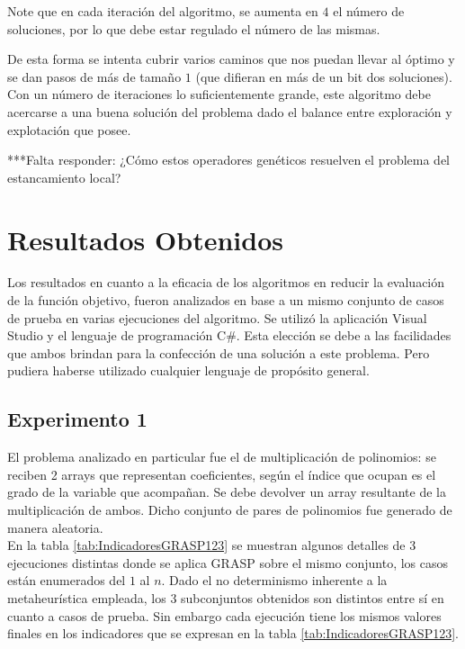 \documentclass[a4paper,12pt]{book}
\begin{document}
		Note que en cada iteración del algoritmo, se aumenta en $4$ el número de soluciones, por lo que debe estar regulado el número de las mismas.
	
		De esta forma se intenta cubrir varios caminos que nos puedan llevar al óptimo y se dan pasos de más de tamaño $1$ (que difieran en más de un bit dos soluciones). Con un número de iteraciones lo suficientemente grande, este algoritmo debe acercarse a una buena solución del problema dado el balance entre exploración y explotación que posee.
		
		***Falta responder: ¿Cómo estos operadores genéticos resuelven el problema del estancamiento local?
	
\chapter{Resultados Obtenidos}

	Los resultados en cuanto a la eficacia de los algoritmos en reducir la evaluación de la función objetivo, fueron analizados en base a un mismo conjunto de casos de prueba en varias ejecuciones del algoritmo. Se utilizó la aplicación Visual Studio y el lenguaje de programación C\#. Esta elección se debe a las facilidades que ambos brindan para la confección de una solución a este problema. Pero pudiera haberse utilizado cualquier lenguaje de propósito general. 
	
	\section{Experimento 1}
	El problema analizado en particular fue el de multiplicación de polinomios: se reciben 2 arrays que representan coeficientes, según el índice que ocupan es el grado de la variable que acompañan. Se debe devolver un array resultante de la multiplicación de ambos. Dicho conjunto de pares de polinomios fue generado de manera aleatoria. \\
	
	En la tabla \ref{tab:IndicadoresGRASP123} se muestran algunos detalles de 3 ejecuciones distintas donde se aplica GRASP sobre el mismo conjunto, los casos están enumerados del $1$ al $n$. Dado el no determinismo inherente a la metaheurística empleada, los 3 subconjuntos obtenidos son distintos entre sí en cuanto a casos de prueba. Sin embargo cada ejecución tiene los mismos valores finales en los indicadores que se expresan en la tabla \ref{tab:IndicadoresGRASP123}.
	
\end{document}
